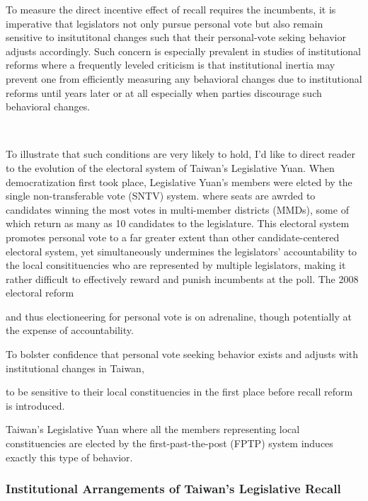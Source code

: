 \documentclass[hyphens, crop=false]{standalone}
\begin{document}
		To measure the direct incentive effect of recall requires the incumbents,
		it is imperative that legislators not only pursue personal vote
		but also remain sensitive to insitutitonal changes such that
		their personal-vote seking behavior adjusts accordingly.
		Such concern is especially prevalent in studies of institutional reforms
		where a frequently leveled criticism is that
		institutional inertia may prevent one from efficiently measuring any behavioral changes
		due to institutional reforms until years later or at all
		especially when parties discourage such behavioral changes.
		
		\
		
		To illustrate that such conditions are very likely to hold,
		I'd like to direct reader to the evolution of the electoral system of
		Taiwan's Legislative Yuan.
		When democratization first took place,
		Legislative Yuan's members were elcted by the single non-transferable vote (SNTV) system.
		where seats are awrded to candidates winning the most votes
		in multi-member districts (MMDs), some of which return as many as 10 candidates to the legislature.
		This electoral system promotes personal vote to a far greater extent than
		other candidate-centered electoral system,
		yet simultaneously undermines the legislators' accountability to
		the local consitituencies who are represented by multiple legislators,
		making it rather difficult to effectively reward and punish incumbents
		at the poll.
		The 2008 electoral reform
		
		and thus
		electioneering for personal vote is on adrenaline,
		though potentially at the expense of accountability.
		
		To bolster confidence that personal vote seeking behavior exists
		and adjusts with institutional changes in Taiwan,
		
		
		to be sensitive to their local constituencies in the first place
		before recall reform is introduced.
		
		
		Taiwan's Legislative Yuan
		where all the members representing local constituencies
		are elected by the first-past-the-post (FPTP) system
		induces exactly this type of behavior.
		
		\subsubsection*{Institutional Arrangements of Taiwan's Legislative Recall}
		
\end{document}
